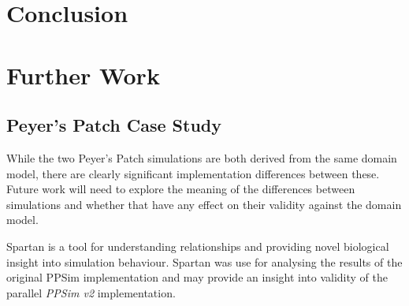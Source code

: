 \documentclass{UoYCSproject}
\begin{document}
\section{Conclusion}



\section{Further Work}
\subsection{Peyer's Patch Case Study}
While the two Peyer's Patch simulations are both derived from the same domain model, there are clearly significant implementation differences between these.
Future work will need to explore the meaning of the differences between simulations and whether that have any effect on their validity against the domain model.

Spartan is a tool for understanding relationships and providing novel biological insight into simulation behaviour.
Spartan was use for analysing the results of the original PPSim implementation\cite{spartan} and may provide an insight into validity of the parallel \textit{PPSim v2} implementation.

\end{document}
